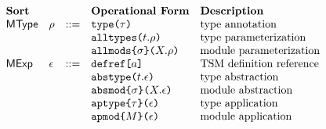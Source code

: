 \[\begin{array}{lllllll}
\textbf{Sort} & & & \textbf{Operational Form} 
& \textbf{Description}\\
\mathsf{MType} & \rho & ::= & \aetype{\tau} 
& \text{type annotation}\\
&&& \aealltypes{t}{\rho} 
& \text{type parameterization}\\
&&& \aeallmods{\sigma}{X}{\rho} 
& \text{module parameterization}\\
\mathsf{MExp} & \epsilon & ::= & \adefref{a} 
& \text{TSM definition reference}\\
&&& \aeabstype{t}{\epsilon} 
& \text{type abstraction}\\
&&& \aeabsmod{\sigma}{X}{\epsilon} 
& \text{module abstraction}\\
&&& \aeaptype{\tau}{\epsilon} 
& \text{type application}\\
&&& \aeapmod{M}{\epsilon} 
& \text{module application}%
\end{array}\]


